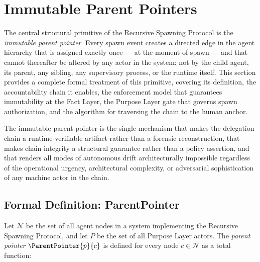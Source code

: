 \section{Immutable Parent Pointers}
\label{sec:rs-immutable-parent-pointers}

The central structural primitive of the Recursive Spawning Protocol is the \emph{immutable parent pointer}. Every spawn event creates a directed edge in the agent hierarchy that is assigned exactly once --- at the moment of spawn --- and that cannot thereafter be altered by any actor in the system: not by the child agent, its parent, any sibling, any supervisory process, or the runtime itself. This section provides a complete formal treatment of this primitive, covering its definition, the accountability chain it enables, the enforcement model that guarantees immutability at the Fact Layer, the Purpose Layer gate that governs spawn authorization, and the algorithm for traversing the chain to the human anchor.

The immutable parent pointer is the single mechanism that makes the delegation chain a runtime-verifiable artifact rather than a forensic reconstruction, that makes chain integrity a structural guarantee rather than a policy assertion, and that renders all modes of autonomous drift architecturally impossible regardless of the operational urgency, architectural complexity, or adversarial sophistication of any machine actor in the chain.

\subsection{Formal Definition: ParentPointer}
\label{sec:rs-parent-pointer-formal}

Let $\mathcal{N}$ be the set of all agent nodes in a \bxthree{} system implementing the Recursive Spawning Protocol, and let $P$ be the set of all Purpose Layer actors. The \emph{parent pointer} $\ParentPointer{p}{c}$ is defined for every node $c \in \mathcal{N}$ as a total function:

